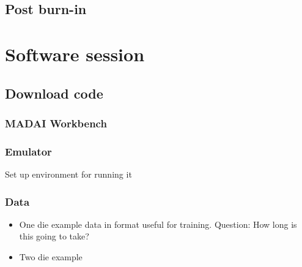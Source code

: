 \subsection{Post burn-in}



\section{Software session}

\subsection{Download code}

\subsubsection{MADAI Workbench}

\subsubsection{Emulator}

Set up environment for running it

\subsubsection{Data}

\begin{itemize}

\item One die example data in format useful for training. Question: How long is this going to take?

\item Two die example

\end{itemize}

